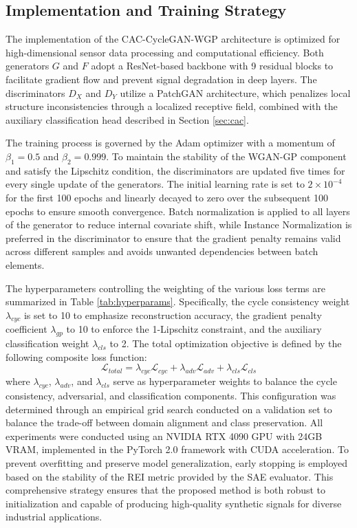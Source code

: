 \subsection{Implementation and Training Strategy}
\label{sec:implementation}

The implementation of the CAC-CycleGAN-WGP architecture is optimized for high-dimensional sensor data processing and computational efficiency. Both generators $G$ and $F$ adopt a ResNet-based backbone with 9 residual blocks to facilitate gradient flow and prevent signal degradation in deep layers. The discriminators $D_X$ and $D_Y$ utilize a PatchGAN architecture, which penalizes local structure inconsistencies through a localized receptive field, combined with the auxiliary classification head described in Section \ref{sec:cac}.

The training process is governed by the Adam optimizer \cite{Kingma2015} with a momentum of $\beta_1 = 0.5$ and $\beta_2 = 0.999$. To maintain the stability of the WGAN-GP component and satisfy the Lipschitz condition, the discriminators are updated five times for every single update of the generators. The initial learning rate is set to $2 \times 10^{-4}$ for the first 100 epochs and linearly decayed to zero over the subsequent 100 epochs to ensure smooth convergence. Batch normalization is applied to all layers of the generator to reduce internal covariate shift, while Instance Normalization is preferred in the discriminator to ensure that the gradient penalty remains valid across different samples and avoids unwanted dependencies between batch elements.

The hyperparameters controlling the weighting of the various loss terms are summarized in Table \ref{tab:hyperparams}. Specifically, the cycle consistency weight $\lambda_{cyc}$ is set to 10 to emphasize reconstruction accuracy, the gradient penalty coefficient $\lambda_{gp}$ to 10 to enforce the 1-Lipschitz constraint, and the auxiliary classification weight $\lambda_{cls}$ to 2. The total optimization objective is defined by the following composite loss function:
\begin{equation}
\mathcal{L}_{total} = \lambda_{cyc}\mathcal{L}_{cyc} + \lambda_{adv}\mathcal{L}_{adv} + \lambda_{cls}\mathcal{L}_{cls}
\label{eq:total_loss}
\end{equation}
where $\lambda_{cyc}$, $\lambda_{adv}$, and $\lambda_{cls}$ serve as hyperparameter weights to balance the cycle consistency, adversarial, and classification components. This configuration was determined through an empirical grid search conducted on a validation set to balance the trade-off between domain alignment and class preservation. All experiments were conducted using an NVIDIA RTX 4090 GPU with 24GB VRAM, implemented in the PyTorch 2.0 framework with CUDA acceleration. To prevent overfitting and preserve model generalization, early stopping is employed based on the stability of the REI metric provided by the SAE evaluator. This comprehensive strategy ensures that the proposed method is both robust to initialization and capable of producing high-quality synthetic signals for diverse industrial applications.
